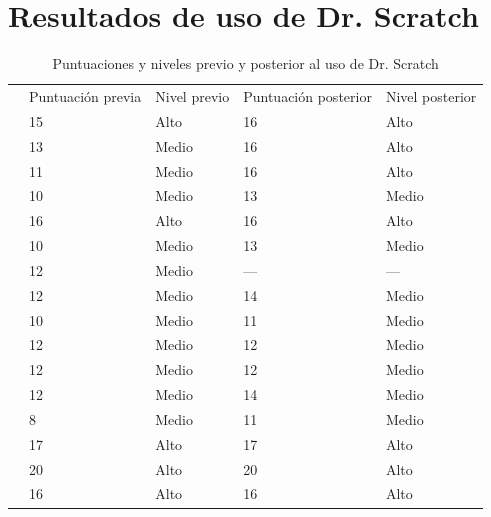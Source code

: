 \documentclass[a4paper, 12pt]{book}
\begin{document}
\chapter{Resultados de uso de Dr. Scratch}

\begin{table}[h]
\centering
\caption{Puntuaciones y niveles previo y posterior al uso de Dr. Scratch}
\label{my-label}
\begin{tabular}{l|l|l|l|l|}
\cline{2-5}
 & Puntuación previa & Nivel previo & Puntuación posterior & Nivel posterior \\ \cline{2-5} 
 & 15                & Alto         & 16                   & Alto            \\ \cline{2-5} 
 & 13                & Medio        & 16                   & Alto            \\ \cline{2-5} 
 & 11                & Medio        & 16                   & Alto            \\ \cline{2-5} 
 & 10                & Medio        & 13                   & Medio           \\ \cline{2-5} 
 & 16                & Alto         & 16                   & Alto            \\ \cline{2-5} 
 & 10                & Medio        & 13                   & Medio           \\ \cline{2-5} 
 & 12                & Medio        & ---                  & ---             \\ \cline{2-5} 
 & 12                & Medio        & 14                   & Medio           \\ \cline{2-5} 
 & 10                & Medio        & 11                   & Medio           \\ \cline{2-5} 
 & 12                & Medio        & 12                   & Medio           \\ \cline{2-5} 
 & 12                & Medio        & 12                   & Medio           \\ \cline{2-5} 
 & 12                & Medio        & 14                   & Medio           \\ \cline{2-5} 
 & 8                 & Medio        & 11                   & Medio           \\ \cline{2-5} 
 & 17                & Alto         & 17                   & Alto            \\ \cline{2-5} 
 & 20                & Alto         & 20                   & Alto            \\ \cline{2-5} 
 & 16                & Alto         & 16                   & Alto            \\ \cline{2-5} 
\end{tabular}
\end{table}
\end{document}
